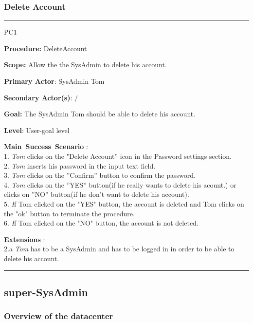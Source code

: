 \subsubsection{Delete Account}

\hrule
\vspace{0.5cm}
\begin{lyxlist}{PC1}
\small{
\item [\textbf{Procedure:}] DeleteAccount 
\item [\textbf{Scope:}] Allow the the SysAdmin to delete his account.
\item [\textbf{Primary Actor}:] SysAdmin Tom
\item [\textbf{Secondary Actor(s)}:] /
\item [\textbf{Goal:}] The SysAdmin Tom should be able to delete his account.
\item [\textbf{Level}:] User-goal level
\item [\textbf{Main~Success~Scenario}]:\\
1. \emph{Tom} clicks on the "Delete Account'' icon in the Password settings
section.\\
2. \emph{Tom} inserts his password in the input text field.\\
3. \emph{Tom} clicks on the ''Confirm'' button to confirm the password.\\
4. \emph{Tom} clicks on the ''YES'' button(if he really wants to delete his
acount.) or clicks on ''NO'' button(if he don't want to delete his account).\\
5. \emph If {Tom} clicked on the "YES" button, the account is deleted and
{Tom} clicks on the "ok" button to terminate the procedure.\\
6. \emph If {Tom} clicked on the "NO" button, the account is not deleted.\\

\item [\textbf{Extensions}]:\\
2.a \emph{Tom} has to be a SysAdmin and has to be logged in in order to be able
to delete his account.\\
}
\end{lyxlist}
\hrule




\subsection{super-SysAdmin}

\subsubsection{Overview of the datacenter}


